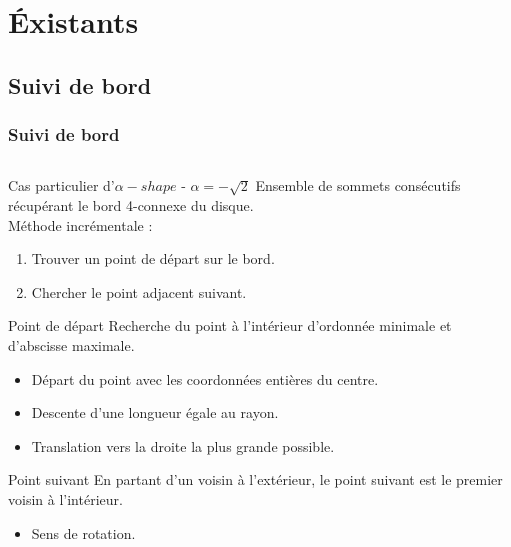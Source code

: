 \section{Éxistants}

\subsection{Suivi de bord}

\begin{frame}
\frametitle{Suivi de bord}


\begin{columns}[t]
  \begin{column}{0.6\linewidth}
    \begin{block}{Cas particulier d'$\alpha-shape$ - $\alpha = -\sqrt{2}$}
      Ensemble de sommets consécutifs récupérant le bord 4-connexe du disque.\\
      Méthode incrémentale :
      \begin{enumerate}
        \item<2-> Trouver un point de départ sur le bord.
        \item<3> Chercher le point adjacent suivant.
      \end{enumerate}
    \end{block}
    {
      \begin{block}{Point de départ}
        Recherche du point à l'intérieur d'ordonnée minimale et d'abscisse maximale.\\
        \begin{itemize}
          \item Départ du point avec les coordonnées entières du centre.
          \item Descente d'une longueur égale au rayon.
          \item Translation vers la droite la plus grande possible.
        \end{itemize}
      \end{block} 
    }
    {
      \begin{block}{Point suivant}
        En partant d'un voisin à l'extérieur, le point suivant est le premier voisin à l'intérieur. 
        \begin{itemize}
          \item Sens de rotation.

\end{itemize}
\end{block}}
\end{column}
\end{columns}
\end{frame}
